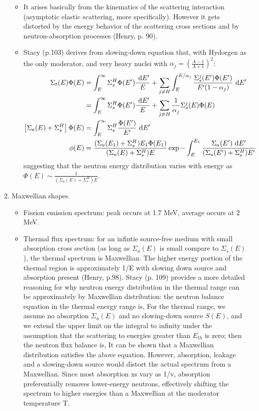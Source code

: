 \documentclass{school-22.211-notes}
\begin{document}
\begin{enumerate}
\begin{itemize}
  \item It arises basically from the kinematics of the scattering interaction (asymptotic elastic scattering, more specifically). However it gets distorted by the energy behavior of the scattering cross sections and by neutron-absorption processes (Henry, p. 90). 
  \item Stacy (p.103) derives from slowing-down equation that, with Hydorgen as the only moderator, and very heavy nuclei with $\alpha_j = \left(\frac{A-1}{A+1} \right)^2$:
    \begin{align}
      \Sigma_t(E) \Phi(E) &= \int_E^{\infty} \Sigma_s^H \Phi(E')\frac{\mbox{ }\mathrm{d} E'}{E} + \displaystyle\sum_{j\neq H} \int_E^{E/\alpha_j} \frac{\Sigma_s^j (E') \Phi(E')}{E'(1-\alpha_j)} \mbox{ }\mathrm{d} E' \\
      &=  \int_E^{\infty} \Sigma_s^H \Phi(E')\frac{\mbox{ }\mathrm{d} E'}{E} + \displaystyle\sum_{j\neq H} \frac{1}{\alpha_j} \Sigma_s^j (E) \Phi(E) \\
      \left[ \Sigma_a (E) + \Sigma_s^H \right] \Phi(E) &= \int_E^{\infty} \Sigma_s^H \frac{\Phi(E')}{E'} \mbox{ }\mathrm{d} E' \\
      \phi(E) &= \frac{(\Sigma_a (E_1) + \Sigma_s^H) E_1 \Phi (E_1) }{(\Sigma_a(E) + \Sigma_s^H) E} \exp{ - \int_E^{E_1} \frac{\Sigma_a (E') \mbox{ }\mathrm{d}E'}{(\Sigma_a(E') + \Sigma_s^H) E'} }
    \end{align} 
    suggesting that the neutron energy distribution varies with energy as $\Phi(E) \sim \frac{1}{(\Sigma_a(E) + \Sigma_s^H) E}$. 
  \end{itemize}
\item Maxwellian shapes.
  \begin{itemize}
  \item Fission emission spectrum: peak occurs at 1.7 MeV, average occurs at 2 MeV.
  \item Thermal flux spectrum: for an infintie source-free medium with small absorption cross section (as long as $\Sigma_a(E)$ is small compare to $\Sigma_s(E)$), the thermal spectrum is Maxwellian. The higher energy portion of the thermal region is approximately 1/E with slowing down source and absorption present (Henry, p.98). Stacy (p. 109) provides a more detailed reasoning for why neutron energy distribution in the thermal range can be approximately by Maxwellian distribution: the neutron balance equation in the thermal energy range is, 
    For the thermal range, we assume no absorption $\Sigma_a(E)$ and no slowing-down source $S(E)$, and we extend the upper limit on the integral to infinity under the assumption that the scattering to energies greater than $E_{th}$ is zero; then the neutron flux balance is,
   It can be shown that a Maxwellian distribution satisfies the above equation. However, absorption, leakage and a slowing-down source would distort the actual spectrum from a Maxwellian. Since most absorption xs vary as 1/v, absorption preferentially removes lower-energy neutrons, effectively shifting the spectrum to higher energies than a Maxwellian at the moderator temperature T. 
  \end{itemize}
\end{enumerate}
\end{document}
